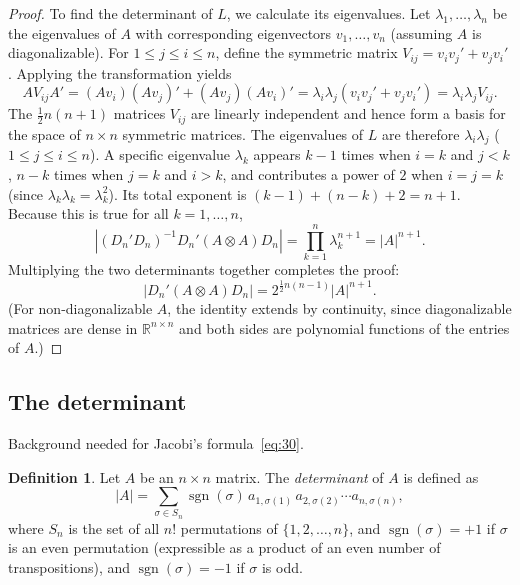 \documentclass[14pt]{extarticle}
\theoremstyle{plain}
\theoremstyle{definition}
\newtheorem{definition}{Definition}
\theoremstyle{remark}
\begin{document}
\begin{proof}
To find the determinant of $L$, we calculate its eigenvalues. Let $\lambda_1, \dots, \lambda_n$ be the eigenvalues of $A$ with corresponding eigenvectors $v_1, \dots, v_n$ (assuming $A$ is diagonalizable). For $1 \leqslant j \leqslant i \leqslant n$, define the symmetric matrix $V_{ij} = v_i v_j' + v_j v_i'$. Applying the transformation yields
\[
A V_{ij} A' = (Av_i)(Av_j)' + (Av_j)(Av_i)' = \lambda_i \lambda_j (v_i v_j' + v_j v_i') = \lambda_i \lambda_j V_{ij}.
\]
The $\frac{1}{2}n(n+1)$ matrices $V_{ij}$ are linearly independent and hence form a basis for the space of $n \times n$ symmetric matrices. The eigenvalues of $L$ are therefore $\lambda_i \lambda_j$ ($1 \leqslant j \leqslant i \leqslant n$). A specific eigenvalue $\lambda_k$ appears $k-1$ times when $i=k$ and $j<k$, $n-k$ times when $j=k$ and $i>k$, and contributes a power of $2$ when $i=j=k$ (since $\lambda_k \lambda_k = \lambda_k^2$). Its total exponent is $(k-1) + (n-k) + 2 = n+1$. Because this is true for all $k=1, \dots, n$,
\[
|(D_n'D_n)^{-1} D_n'(A \otimes A)D_n| = \prod_{k=1}^n \lambda_k^{n+1} = |A|^{n+1}.
\]
Multiplying the two determinants together completes the proof:
\[
|D_n'(A \otimes A)D_n| = 2^{\frac{1}{2}n(n-1)} |A|^{n+1}.
\]
(For non-diagonalizable $A$, the identity extends by continuity, since diagonalizable matrices are dense in $\mathbb{R}^{n \times n}$ and both sides are polynomial functions of the entries of $A$.)
\end{proof}

\subsection{The determinant}\label{sec:2.7}

Background needed for Jacobi's formula~\eqref{eq:30}.

\begin{definition}\label{def:det}
Let $A$ be an $n \times n$ matrix. The \emph{determinant} of $A$ is defined as
\begin{equation}\label{eq:det}
|A| = \sum_{\sigma \in S_n} \operatorname{sgn}(\sigma)\, a_{1,\sigma(1)}\, a_{2,\sigma(2)} \cdots a_{n,\sigma(n)},
\end{equation}
where $S_n$ is the set of all $n!$ permutations of $\{1, 2, \dots, n\}$, and $\operatorname{sgn}(\sigma) = +1$ if $\sigma$ is an even permutation (expressible as a product of an even number of transpositions), and $\operatorname{sgn}(\sigma) = -1$ if $\sigma$ is odd.
\end{definition}
\end{document}
